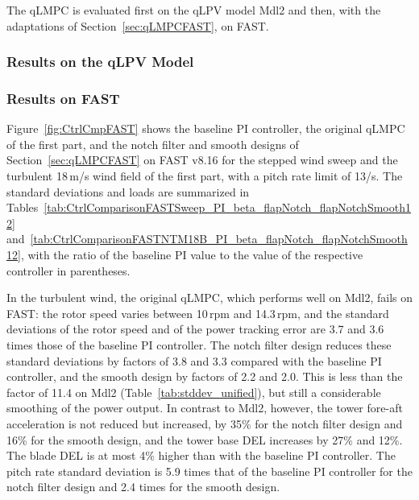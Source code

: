 
The qLMPC is evaluated first on the qLPV model Mdl2 and then, with the adaptations of Section~\ref{sec:qLMPCFAST}, on FAST.

\subsubsection{Results on the qLPV Model}\label{subsubsec:qLMPCMdl2results}

\subsubsection{Results on FAST}\label{subsubsec:qLMPCFASTresults}

Figure~\ref{fig:CtrlCmpFAST} shows the baseline PI controller, the original qLMPC of the first part, and the notch filter and smooth designs of Section~\ref{sec:qLMPCFAST} on FAST v8.16 for the stepped wind sweep and the turbulent 18\,m/s wind field of the first part, with a pitch rate limit of 13\textdegree/s. The standard deviations and loads are summarized in Tables~\ref{tab:CtrlComparisonFASTSweep_PI_beta_flapNotch_flapNotchSmooth12} and~\ref{tab:CtrlComparisonFASTNTM18B_PI_beta_flapNotch_flapNotchSmooth12}, with the ratio of the baseline PI value to the value of the respective controller in parentheses.

In the turbulent wind, the original qLMPC, which performs well on Mdl2, fails on FAST: the rotor speed varies between 10\,rpm and 14.3\,rpm, and the standard deviations of the rotor speed and of the power tracking error are 3.7 and 3.6 times those of the baseline PI controller. The notch filter design reduces these standard deviations by factors of 3.8 and 3.3 compared with the baseline PI controller, and the smooth design by factors of 2.2 and 2.0. This is less than the factor of 11.4 on Mdl2 (Table~\ref{tab:stddev_unified}), but still a considerable smoothing of the power output. In contrast to Mdl2, however, the tower fore-aft acceleration is not reduced but increased, by 35\% for the notch filter design and 16\% for the smooth design, and the tower base DEL increases by 27\% and 12\%. The blade DEL is at most 4\% higher than with the baseline PI controller. The pitch rate standard deviation is 5.9 times that of the baseline PI controller for the notch filter design and 2.4 times for the smooth design.

